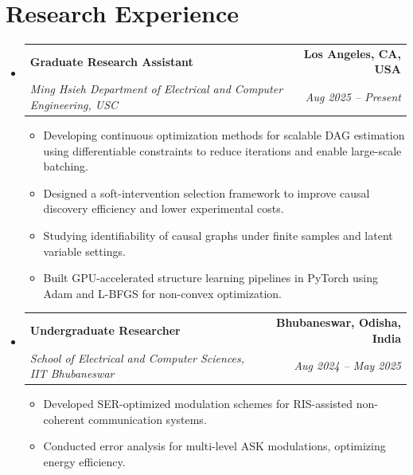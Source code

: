 \documentclass[10pt,letterpaper]{article}
\makeatletter
\newcommand{\resumeItem}[1]{
  \item\small{
    {#1 \vspace{-2pt}}
  }
}
\newcommand{\resumeSubheading}[4]{
  \vspace{-1pt}\item
    \begin{tabular*}{0.99\textwidth}[t]{l@{\extracolsep{\fill}}r}
      \textbf{#1} & \textbf{#2} \\
      \textit{\small#3} & \textit{\small #4} \\
    \end{tabular*}\vspace{-5pt}
}
\newcommand{\resumeSubHeadingListStart}{\begin{itemize}[leftmargin=*, label={}]}
\newcommand{\resumeSubHeadingListEnd}{\end{itemize}}
\makeatother
\begin{document}
\section{Research Experience}
  \resumeSubHeadingListStart

    \resumeSubheading
  {Graduate Research Assistant}{Los Angeles, CA, USA}
  {Ming Hsieh Department of Electrical and Computer Engineering, USC}{Aug 2025 -- Present}
  \begin{itemize}[leftmargin=*, noitemsep]
    \resumeItem{Developing continuous optimization methods for scalable DAG estimation using differentiable constraints to reduce iterations and enable large-scale batching.}
    \resumeItem{Designed a soft-intervention selection framework to improve causal discovery efficiency and lower experimental costs.}
    \resumeItem{Studying identifiability of causal graphs under finite samples and latent variable settings.}
    \resumeItem{Built GPU-accelerated structure learning pipelines in PyTorch using Adam and L-BFGS for non-convex optimization.}
  \end{itemize}

    \resumeSubheading
      {Undergraduate Researcher}{Bhubaneswar, Odisha, India}
      {School of Electrical and Computer Sciences, IIT Bhubaneswar}{Aug 2024 -- May 2025}
      \begin{itemize}[leftmargin=*, noitemsep]
        \resumeItem{Developed SER-optimized modulation schemes for RIS-assisted non-coherent communication systems.}
        \resumeItem{Conducted error analysis for multi-level ASK modulations, optimizing energy efficiency.}
      \end{itemize}

  \resumeSubHeadingListEnd

\end{document}
